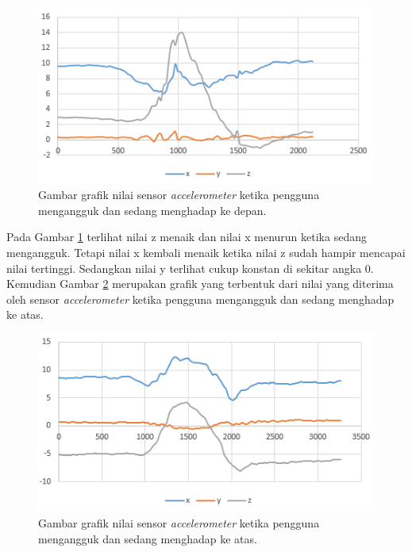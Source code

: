\begin{figure}[htbp]
\centering
\includegraphics[scale=1]{Gambar/grafik-sensor-accelerometer-mengangguk-depan.png}
\caption{Gambar grafik nilai sensor \textit{accelerometer} ketika pengguna mengangguk dan sedang menghadap ke depan.} 
\label{fig:grafik-sensor-accelerometer-mengangguk-depan}
\end{figure}
Pada Gambar \ref{fig:grafik-sensor-accelerometer-mengangguk-depan} terlihat nilai z menaik dan nilai x menurun ketika sedang mengangguk. Tetapi nilai x kembali menaik ketika nilai z sudah hampir mencapai nilai tertinggi. Sedangkan nilai y terlihat cukup konstan di sekitar angka 0. Kemudian Gambar \ref{fig:grafik-sensor-accelerometer-mengangguk-atas} merupakan grafik yang terbentuk dari nilai yang diterima oleh sensor \textit{accelerometer} ketika pengguna mengangguk dan sedang menghadap ke atas.

\begin{figure}[htbp]
\centering
\includegraphics[scale=1]{Gambar/grafik-sensor-accelerometer-mengangguk-atas.png}
\caption{Gambar grafik nilai sensor \textit{accelerometer} ketika pengguna mengangguk dan sedang menghadap ke atas.} 
\label{fig:grafik-sensor-accelerometer-mengangguk-atas}
\end{figure}

